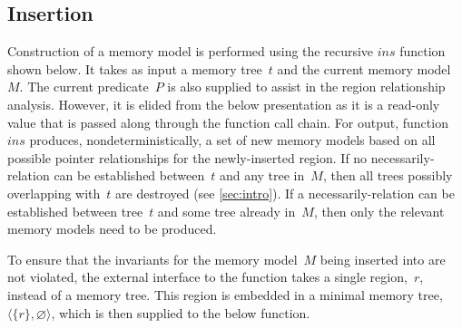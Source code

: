 \subsection{Insertion}
Construction of a memory model is performed
using the recursive $\mathit{ins}$ function shown below.
It takes as input a memory tree~$t$ and the current memory model~$M$.
The current predicate~$P$ is also supplied
to assist in the region relationship analysis.
However, it is elided from the below presentation as it is a read-only value
that is passed along through the function call chain.
For output, function $\mathit{ins}$ produces, nondeterministically,
a set of new memory models based on all possible pointer relationships
for the newly-inserted region.
If no necessarily-relation can be established between~$t$ and any tree in~$M$, then all trees possibly overlapping with~$t$ are destroyed (see \cref{sec:intro}).
If a necessarily-relation can be established between tree~$t$ and some tree already in~$M$, then only the relevant memory models need to be produced.

To ensure that the invariants for the memory model~$M$ being inserted into
are not violated, the external interface to the function takes a single region,~$r$, instead of a memory tree.
This region is embedded in a minimal memory tree,
$\langle \{r\},\varnothing\rangle$,
which is then supplied to the below function.

